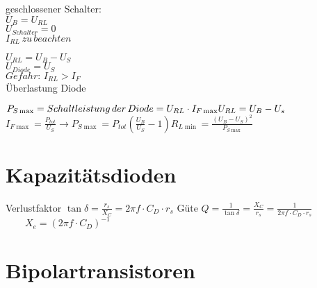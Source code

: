     \begin{minipage}{0.2\columnwidth}
        geschlossener Schalter:\\
        $U_B=U_{RL}$\\
        $U_{Schalter}=0$\\
        $I_{RL}\, zu\, beachten$
    \end{minipage}
    \begin{minipage}{0.5\columnwidth}
    \end{minipage}
    \begin{minipage}{0.3\columnwidth}
        $U_{RL}=U_B-U_S$\\
        $U_{Diode}=U_S$\\
        $Gefahr:\, I_{RL}>I_F$\\
        Überlastung Diode
    \end{minipage}

    $P_{S\max}=Schaltleistung\, der\, Diode=U_{RL}\cdot I_{F\max}\\
    U_{RL}=U_B-U_s$\hspace*{1cm}$I_{F\max}=\frac{P_{tot}}{U_S}\longrightarrow P_{S\max}=P_{tot}(\frac{U_B}{U_S}-1)$\hspace*{1cm}$R_{L\min}=\frac{(U_B-U_S)^2}{P_{S\max}}$

    \section{Kapazitätsdioden}
    \begin{minipage}{0.3\columnwidth}
    \end{minipage}
    \begin{minipage}{0.6\columnwidth}
        Verlustfaktor $\tan\delta=\frac{r_s}{X_C}=2\pi f\cdot C_D\cdot r_s$ Güte $Q=\frac{1}{\tan\delta}=\frac{X_C}{r_s}=\frac{1}{2\pi f\cdot C_D\cdot r_s}$\\
        $\quad\quad X_e=(2\pi f\cdot C_D)^{-1}$\\
        
    \end{minipage}

    \section{Bipolartransistoren}
    
